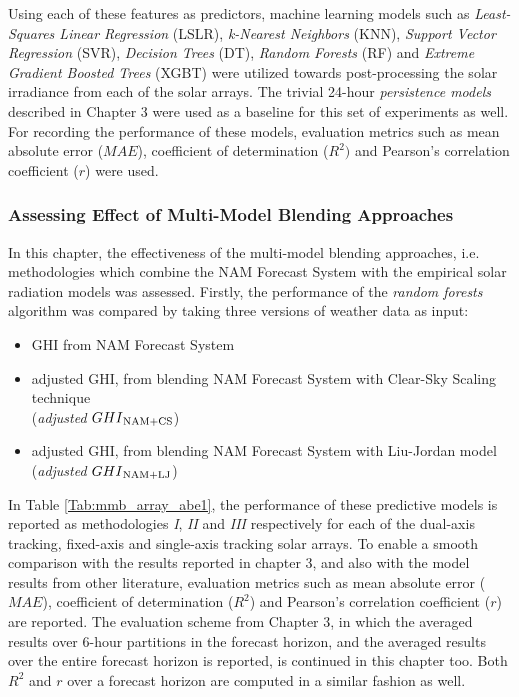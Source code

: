 \par Using each of these features as predictors, machine learning models such as \textit{Least-Squares Linear Regression} (LSLR), \textit{k-Nearest Neighbors} (KNN), \textit{Support Vector Regression} (SVR), \textit{Decision Trees} (DT), \textit{Random Forests} (RF) and \textit{Extreme Gradient Boosted Trees} (XGBT) were utilized towards post-processing the solar irradiance from each of the solar arrays. The trivial 24-hour \textit{persistence models} described in Chapter 3 were used as a baseline for this set of experiments as well. For recording the performance of these models, evaluation metrics such as mean absolute error ($MAE$), coefficient of determination ($R^2)$ and Pearson's correlation coefficient ($r$) were used.

\subsubsection*{Assessing Effect of Multi-Model Blending Approaches}
\par In this chapter, the effectiveness of the multi-model blending approaches, i.e. methodologies which combine the NAM Forecast System with the empirical solar radiation models was assessed. Firstly, the performance of the \textit{random forests} algorithm was compared by taking three versions of weather data as input:
\begin{itemize}[noitemsep]
    \item GHI from NAM Forecast System
    \item adjusted GHI, from blending NAM Forecast System with Clear-Sky Scaling technique \\ (\textit{adjusted} $GHI\textsubscript{NAM+CS}$)
    \item adjusted GHI, from blending NAM Forecast System with Liu-Jordan model \\ (\textit{adjusted} $GHI\textsubscript{NAM+LJ}$)
\end{itemize}

\par In Table \ref{Tab:mmb_array_abe1}, the performance of these predictive models is reported as methodologies \textit{I}, \textit{II} and \textit{III} respectively for each of the dual-axis tracking, fixed-axis and single-axis tracking solar arrays. To enable a smooth comparison with the results reported in chapter 3, and also with the model results from other literature, evaluation metrics such as mean absolute error ($MAE$), coefficient of determination ($R^2$) and Pearson's correlation coefficient ($r$) are reported. The evaluation scheme from Chapter 3, in which the averaged results over 6-hour partitions in the forecast horizon, and the averaged results over the entire forecast horizon is reported, is continued in this chapter too. Both $R^2$ and $r$ over a forecast horizon are computed in a similar fashion as well.

